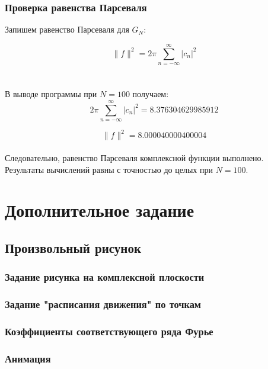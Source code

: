 \documentclass[a5paper, 10pt]{article}
\theoremstyle{definition}
\theoremstyle{plain}
\theoremstyle{remark}
\begin{document}
\subsubsection{Проверка равенства Парсеваля}

Запишем равенство Парсеваля для $G_N$:

\begin{equation}
\| f \|^2 = 2 \pi \sum \limits_{n = -\infty}^{\infty} |c_n |^2
\end{equation}
\\
\\
 В выводе программы при $N=100$ получаем:
\begin{equation*}
2 \pi \sum \limits_{n = -\infty}^{\infty} |c_n |^2 = 8.376304629985912
\end{equation*}

\begin{equation*}
\| f \|^2  = 8.000040000400004
\end{equation*}
\\
Следовательно, равенство Парсеваля комплексной функции выполнено. Результаты вычислений равны с точностью до целых при $N = 100$.






\section{Дополнительное задание}
\subsection{Произвольный рисунок}

\subsubsection{Задание рисунка на комплексной плоскости}


\subsubsection{Задание "расписания движения" по точкам}


\subsubsection{Коэффициенты соответствующего ряда Фурье}


\subsubsection{Анимация}





 
\end{document}

